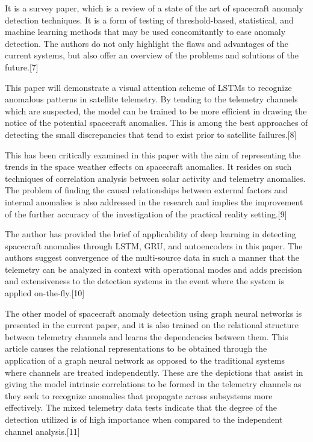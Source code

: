 \documentclass[conference]{IEEEtran}
\begin{document}
It is a survey paper, which is a review of a state of the art of spacecraft anomaly detection techniques. It is a form of testing of threshold-based, statistical, and machine learning methods that may be used concomitantly to ease anomaly detection. The authors do not only highlight the flaws and advantages of the current systems, but also offer an overview of the problems and solutions of the future.[7]

This paper will demonstrate a visual attention scheme of LSTMs to recognize anomalous patterns in satellite telemetry. By tending to the telemetry channels which are suspected, the model can be trained to be more efficient in drawing the notice of the potential spacecraft anomalies. This is among the best approaches of detecting the small discrepancies that tend to exist prior to satellite failures.[8]

This has been critically examined in this paper with the aim of representing the trends in the space weather effects on spacecraft anomalies. It resides on such techniques of correlation analysis between solar activity and telemetry anomalies. The problem of finding the causal relationships between external factors and internal anomalies is also addressed in the research and implies the improvement of the further accuracy of the investigation of the practical reality setting.[9]

The author has provided the brief of applicability of deep learning in detecting spacecraft anomalies through LSTM, GRU, and autoencoders in this paper. The authors suggest convergence of the multi-source data in such a manner that the telemetry can be analyzed in context with operational modes and adds precision and extensiveness to the detection systems in the event where the system is applied on-the-fly.[10]

The other model of spacecraft anomaly detection using graph neural networks is presented in the current paper, and it is also trained on the relational structure between telemetry channels and learns the dependencies between them. This article causes the relational representations to be obtained through the application of a graph neural network as opposed to the traditional systems where channels are treated independently. These are the depictions that assist in giving the model intrinsic correlations to be formed in the telemetry channels as they seek to recognize anomalies that propagate across subsystems more effectively. The mixed telemetry data tests indicate that the degree of the detection utilized is of high importance when compared to the independent channel analysis.[11]
\end{document}
